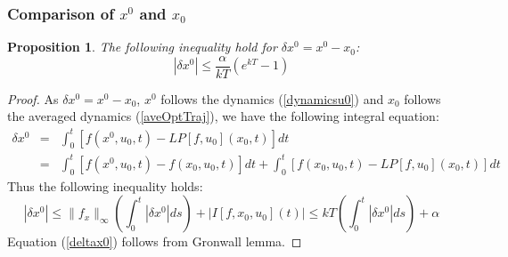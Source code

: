 \documentclass[a4paper,10pt]{article}
\newtheorem{proposition}{Proposition}
\begin{document}
\subsubsection{Comparison of $x^{0}$ and $x_{0}$}
\begin{proposition}\label{deltax0prop}
    The following inequality hold for $\delta x^{0} = x^{0}-x_{0}$:
    \begin{equation}
        |\delta x^{0}| \leq \frac{\alpha}{kT} \left(e^{kT}-1\right)
        \label{deltax0}
    \end{equation}
\end{proposition}
\begin{proof}
    As  $\delta x^{0} = x^{0}-x_{0}$, $x^{0}$ follows the dynamics 
    (\ref{dynamicsu0}) and $x_{0}$ follows the averaged dynamics 
    (\ref{aveOptTraj}), we have the following integral equation:
    \begin{eqnarray*}
         \delta x^{0}& = & \int_{0}^{t} [f(x^{0},u_{0},t) - 
	 LP[f,u_{0}](x_{0},t)]dt \\
          & = & \int_{0}^{t} [f(x^{0},u_{0},t) - f(x_{0},u_{0},t)]dt
	  + \int_{0}^{t} [f(x_{0},u_{0},t) - LP[f,u_{0}](x_{0},t)]dt
     \end{eqnarray*}
     Thus the following inequality holds:
\[
             |\delta x^{0}|  \leq  
	     \|f_{x}\|_{\infty}\left(\int_{0}^{t}|\delta x^{0}|ds\right)  + |I[f,x_{0},u_{0}](t)|
	        \leq kT \left(\int_{0}^{t}|\delta x^{0}|ds\right) +\alpha
\]
Equation (\ref{deltax0}) follows from Gronwall lemma.
\end{proof}
\end{document}
